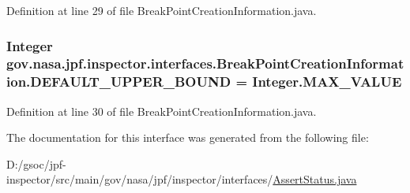Definition at line 29 of file Break\+Point\+Creation\+Information.\+java.

\subsubsection[{\texorpdfstring{D\+E\+F\+A\+U\+L\+T\+\_\+\+U\+P\+P\+E\+R\+\_\+\+B\+O\+U\+ND}{DEFAULT_UPPER_BOUND}}]{\setlength{\rightskip}{0pt plus 5cm}Integer gov.\+nasa.\+jpf.\+inspector.\+interfaces.\+Break\+Point\+Creation\+Information.\+D\+E\+F\+A\+U\+L\+T\+\_\+\+U\+P\+P\+E\+R\+\_\+\+B\+O\+U\+ND = Integer.\+M\+A\+X\+\_\+\+V\+A\+L\+UE\hspace{0.3cm}{\ttfamily [inherited]}}\hypertarget{interfacegov_1_1nasa_1_1jpf_1_1inspector_1_1interfaces_1_1_break_point_creation_information_af917e7de77b2a6fc93c24e1c5a4a5759}{}\label{interfacegov_1_1nasa_1_1jpf_1_1inspector_1_1interfaces_1_1_break_point_creation_information_af917e7de77b2a6fc93c24e1c5a4a5759}


Definition at line 30 of file Break\+Point\+Creation\+Information.\+java.



The documentation for this interface was generated from the following file\+:\begin{DoxyCompactItemize}
\item 
D\+:/gsoc/jpf-\/inspector/src/main/gov/nasa/jpf/inspector/interfaces/\hyperlink{_assert_status_8java}{Assert\+Status.\+java}\end{DoxyCompactItemize}
